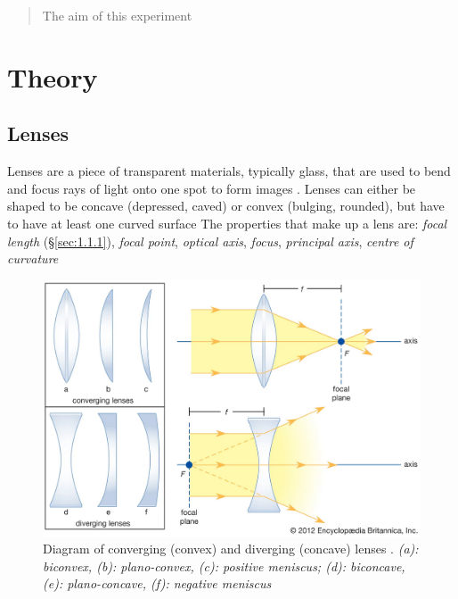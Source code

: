 \documentclass[12pt]{article}
\begin{document}
\setcounter{page}{1}
\tableofcontents

\newpage

\begin{abstract}

\vspace{1cm}

The aim of this experiment 

\end{abstract}


\section{Theory} \label{sec:1}


\subsection{Lenses} \label{sec:1.1}

Lenses are a piece of transparent materials, typically glass, that are used to bend and focus rays of light onto one spot to form images
\cite{britlens,vedantulens}.
Lenses can either be shaped to be concave (depressed, caved) or convex (bulging, rounded), but have to have at least one curved surface
\cite{britlens,vedantulens}
The properties that make up a lens are: \textit{focal length} (§\ref{sec:1.1.1}), \textit{focal point}, \textit{optical axis}, \textit{focus}, \textit{principal axis}, \textit{centre of curvature}
\cite{geekconcave,geekconvex}

\begin{figure}[H]
    \centering
    \includegraphics[width=15cm]{lenses.png}
    \caption{\centering Diagram of converging (convex) and diverging (concave) lenses \protect\cite{britlens}.
    \newline
    \centering \scriptsize{\textit{(a): biconvex, (b): plano-convex, (c): positive meniscus; (d): biconcave, (e): plano-concave, (f): negative meniscus}}}
    \label{fig:lens}
\end{figure}
\end{document}
